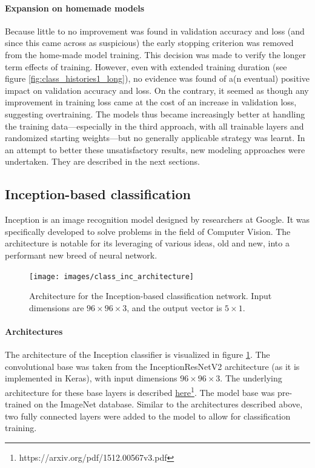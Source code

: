 \paragraph{Expansion on homemade models}
Because little to no improvement was found in validation accuracy and loss (and since this came across as suspicious) the early stopping criterion was removed from the home-made model training. This decision was made to verify the longer term effects of training. However, even with extended training duration (see figure \ref{fig:class_histories1_long}), no evidence was found of a(n eventual) positive impact on validation accuracy and loss. On the contrary, it seemed as though any improvement in training loss came at the cost of an increase in validation loss, suggesting overtraining. The models thus became increasingly better at handling the training data---especially in the third approach, with all trainable layers and randomized starting weights---but no generally applicable strategy was learnt. In an attempt to better these unsatisfactory results, new modeling approaches were undertaken. They are described in the next sections.





\subsection{Inception-based classification}

Inception is an image recognition model designed by researchers at Google. It was specifically developed to solve problems in the field of Computer Vision. The architecture is notable for its leveraging of various ideas, old and new, into a performant new breed of neural network. 

\begin{figure}[!htbp]
	\begin{center}
		\texttt{[image: images/class\_inc\_architecture]}
		\caption{Architecture for the Inception-based classification network. Input dimensions are $96\times 96\times3$, and the output vector is $5\times1$. }
		\label{fig:class_inc}
	\end{center}
\end{figure}

\paragraph{Architectures} 
The architecture of the Inception classifier is visualized in figure \ref{fig:class_inc}. The convolutional base was taken from the InceptionResNetV2 architecture (as it is implemented in Keras), with input dimensions $96\times 96\times3$. The underlying architecture for these base layers is described \textcolor{blue}{\href{https://github.com/WouterDurnez/003_FinalProject} {here\footnote{https://arxiv.org/pdf/1512.00567v3.pdf}}}. The model base was pre-trained on the ImageNet database. Similar to the architectures described above, two fully connected layers were added to the model to allow for classification training.


